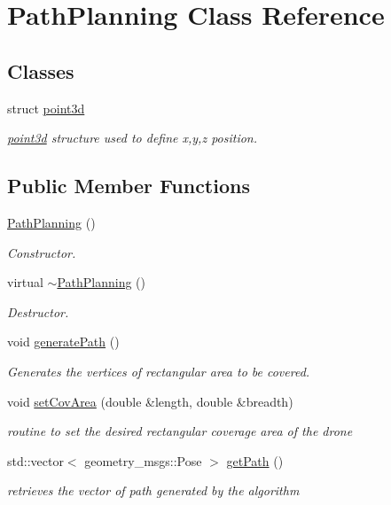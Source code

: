 \hypertarget{class_path_planning}{}\section{Path\+Planning Class Reference}
\label{class_path_planning}
\subsection*{Classes}
\begin{DoxyCompactItemize}
\item 
struct \hyperlink{struct_path_planning_1_1point3d}{point3d}
\begin{DoxyCompactList}\small\item\em \hyperlink{struct_path_planning_1_1point3d}{point3d} structure used to define x,y,z position. \end{DoxyCompactList}\end{DoxyCompactItemize}
\subsection*{Public Member Functions}
\begin{DoxyCompactItemize}
\item 
\hyperlink{class_path_planning_a314735f239a01515a3450205dd144619}{Path\+Planning} ()
\begin{DoxyCompactList}\small\item\em Constructor. \end{DoxyCompactList}\item 
virtual \hyperlink{class_path_planning_ab1f231c8ce62aac1f2e9743aa85ba940}{$\sim$\+Path\+Planning} ()
\begin{DoxyCompactList}\small\item\em Destructor. \end{DoxyCompactList}\item 
void \hyperlink{class_path_planning_ad33a2b593856254514ecafd645f8fd22}{generate\+Path} ()
\begin{DoxyCompactList}\small\item\em Generates the vertices of rectangular area to be covered. \end{DoxyCompactList}\item 
void \hyperlink{class_path_planning_a53187b7b59c8f1b57202c1a041d94c39}{set\+Cov\+Area} (double \&length, double \&breadth)
\begin{DoxyCompactList}\small\item\em routine to set the desired rectangular coverage area of the drone \end{DoxyCompactList}\item 
std\+::vector$<$ geometry\+\_\+msgs\+::\+Pose $>$ \hyperlink{class_path_planning_a65bf5bc6d0a9e344a20593d6ecf8ca00}{get\+Path} ()
\begin{DoxyCompactList}\small\item\em retrieves the vector of path generated by the algorithm \end{DoxyCompactList}\end{DoxyCompactItemize}


